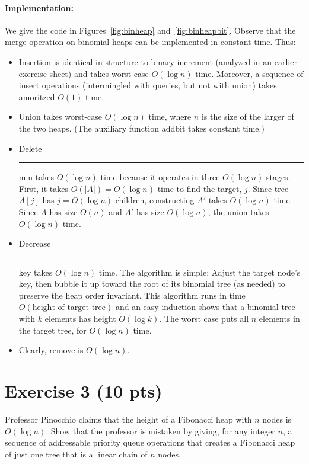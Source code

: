 \documentclass[a4paper]{article}
\newcommand{\any}{{\rule[-.2ex]{1ex}{.4pt}}}	%
\begin{document}
\paragraph{Implementation:}
We give the code in Figures~\ref{fig:binheap} and~\ref{fig:binheapbit}.
Observe that the merge operation on binomial heaps can be implemented in constant time.
Thus:
\begin{itemize}

\item
Insertion is identical in structure to binary increment (analyzed in an earlier exercise sheet) and takes worst-case $O(\log n)$ time.
Moreover, a sequence of insert operations (intermingled with queries, but not with union) takes amoritzed $O(1)$ time.

\item
Union takes worst-case $O(\log n)$ time, where $n$ is the size of the larger of the two heaps.
(The auxiliary function addbit takes constant time.)

\item
Delete\any{}min takes $O(\log n)$ time because it operates in three $O(\log n)$ stages.
First, it takes $O(|A|) = O(\log n)$ time to find the target, $j$.
Since tree $A[j]$ has $j = O(\log n)$ children, constructing $A'$ takes $O(\log n)$ time.
Since $A$ has size $O(n)$ and $A'$ has size $O(\log n)$, the union takes $O(\log n)$ time.

\item
Decrease\any{}key takes $O(\log n)$ time.
The algorithm is simple:
Adjust the target node's key, then bubble it up toward the root of its binomial tree (as needed) to preserve the heap order invariant.
This algorithm runs in time $O(\text{height of target tree})$ and an easy induction shows that a binomial tree with $k$ elements has height $O(\log k)$.
The worst case puts all $n$ elements in the target tree, for $O(\log n)$ time.

\item
Clearly, remove is $O(\log n)$.

\end{itemize}

\section{Exercise 3 (10 pts)}

Professor Pinocchio claims that the height of a Fibonacci heap with $n$ nodes is $O(\log n)$. Show that the professor is mistaken by giving, for any integer $n$, a sequence of addressable priority queue operations that creates a Fibonacci heap of just one tree that is a linear chain of $n$ nodes.
\end{document}
